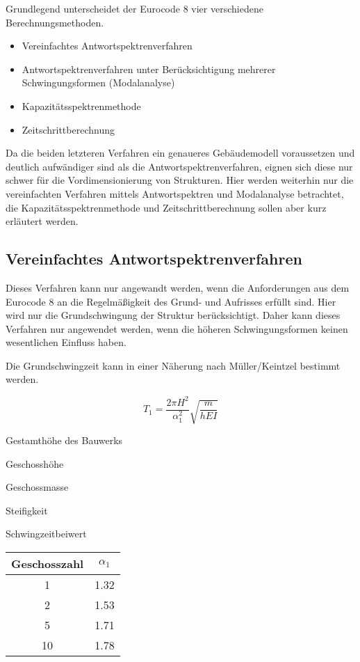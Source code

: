 Grundlegend unterscheidet der Eurocode 8 vier verschiedene Berechnungsmethoden.

\begin{itemize}
  \item Vereinfachtes Antwortspektrenverfahren
  \item Antwortspektrenverfahren unter Berücksichtigung mehrerer Schwingungsformen (Modalanalyse)
  \item Kapazitätsspektrenmethode
  \item Zeitschrittberechnung
\end{itemize}

Da die beiden letzteren Verfahren ein genaueres Gebäudemodell voraussetzen und deutlich aufwändiger sind als die Antwortspektrenverfahren, eignen sich diese nur schwer für die Vordimensionierung von Strukturen. 
Hier werden weiterhin nur die vereinfachten Verfahren mittels Antwortspektren und Modalanalyse betrachtet, die Kapazitätsspektrenmethode und Zeitschrittberechnung sollen aber kurz erläutert werden.

\pagebreak

\subsection{Vereinfachtes Antwortspektrenverfahren}
\label{sec:Antwortspektrenverfahren}

Dieses Verfahren kann nur angewandt werden, wenn die Anforderungen aus dem Eurocode 8 an die Regelmäßigkeit des Grund- und Aufrisses erfüllt sind.
Hier wird nur die Grundschwingung der Struktur berücksichtigt. Daher kann dieses Verfahren nur angewendet werden, wenn die höheren Schwingungsformen keinen wesentlichen Einfluss haben.

Die Grundschwingzeit kann in einer Näherung nach Müller/Keintzel bestimmt werden.

\begin{equation*}
T_1 = \frac{2 \pi H^2}{\alpha_1^2}\sqrt{\frac{m}{hEI}}
\end{equation*}

\thinspace

\begin{multicols}{2}
 Gestamthöhe des Bauwerks \par
{} Geschosshöhe \par
{} Geschossmasse \par
{} Steifigkeit \par 
{} Schwingzeitbeiwert \par
\columnbreak
\begin{flushright}
\begin{tabular}{ |c|c| } 
 \hline
 Geschosszahl & $\alpha_1$ \\
 \hline\hline
 1 & 1.32 \\ 
 2 & 1.53 \\ 
 5 & 1.71 \\ 
 10 & 1.78 \\ 
 \hline
\end{tabular}
\end{flushright}
\end{multicols}

